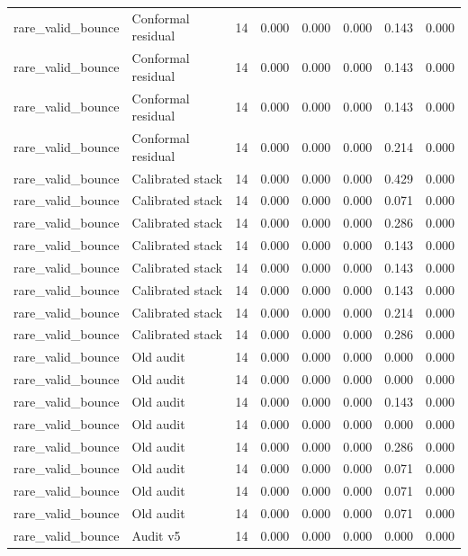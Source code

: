 {\begin{longtable}{llrrrrrr}
rare\_valid\_bounce & Conformal residual & 14 & 0.000 & 0.000 & 0.000 & 0.143 & 0.000 \\
rare\_valid\_bounce & Conformal residual & 14 & 0.000 & 0.000 & 0.000 & 0.143 & 0.000 \\
rare\_valid\_bounce & Conformal residual & 14 & 0.000 & 0.000 & 0.000 & 0.143 & 0.000 \\
rare\_valid\_bounce & Conformal residual & 14 & 0.000 & 0.000 & 0.000 & 0.214 & 0.000 \\
rare\_valid\_bounce & Calibrated stack & 14 & 0.000 & 0.000 & 0.000 & 0.429 & 0.000 \\
rare\_valid\_bounce & Calibrated stack & 14 & 0.000 & 0.000 & 0.000 & 0.071 & 0.000 \\
rare\_valid\_bounce & Calibrated stack & 14 & 0.000 & 0.000 & 0.000 & 0.286 & 0.000 \\
rare\_valid\_bounce & Calibrated stack & 14 & 0.000 & 0.000 & 0.000 & 0.143 & 0.000 \\
rare\_valid\_bounce & Calibrated stack & 14 & 0.000 & 0.000 & 0.000 & 0.143 & 0.000 \\
rare\_valid\_bounce & Calibrated stack & 14 & 0.000 & 0.000 & 0.000 & 0.143 & 0.000 \\
rare\_valid\_bounce & Calibrated stack & 14 & 0.000 & 0.000 & 0.000 & 0.214 & 0.000 \\
rare\_valid\_bounce & Calibrated stack & 14 & 0.000 & 0.000 & 0.000 & 0.286 & 0.000 \\
rare\_valid\_bounce & Old audit & 14 & 0.000 & 0.000 & 0.000 & 0.000 & 0.000 \\
rare\_valid\_bounce & Old audit & 14 & 0.000 & 0.000 & 0.000 & 0.000 & 0.000 \\
rare\_valid\_bounce & Old audit & 14 & 0.000 & 0.000 & 0.000 & 0.143 & 0.000 \\
rare\_valid\_bounce & Old audit & 14 & 0.000 & 0.000 & 0.000 & 0.000 & 0.000 \\
rare\_valid\_bounce & Old audit & 14 & 0.000 & 0.000 & 0.000 & 0.286 & 0.000 \\
rare\_valid\_bounce & Old audit & 14 & 0.000 & 0.000 & 0.000 & 0.071 & 0.000 \\
rare\_valid\_bounce & Old audit & 14 & 0.000 & 0.000 & 0.000 & 0.071 & 0.000 \\
rare\_valid\_bounce & Old audit & 14 & 0.000 & 0.000 & 0.000 & 0.071 & 0.000 \\
rare\_valid\_bounce & Audit v5 & 14 & 0.000 & 0.000 & 0.000 & 0.000 & 0.000 \\

\end{longtable}}
